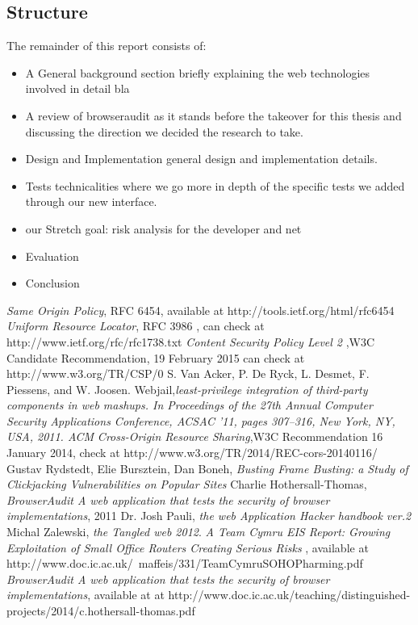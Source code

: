 \documentclass[a4paper,12pt]{report}
\begin{document}
\subsection{Structure}
The remainder of this report consists of:
\begin{itemize}
 \item A General background section briefly explaining the web technologies involved in detail bla
 \item A review of browseraudit as it stands before the takeover for this thesis and discussing the direction we decided the research to take.
 \item Design and Implementation general design and implementation details.
 \item Tests technicalities where we go more in depth of the specific tests we added through our new interface.
 \item our Stretch goal: risk analysis for the developer and net 
 \item Evaluation
 \item Conclusion
\end{itemize}













\begin{thebibliography}{1}
  \emph {Same Origin Policy}, RFC 6454, available at  http://tools.ietf.org/html/rfc6454
  \emph{Uniform Resource Locator}, RFC 3986 , can check at http://www.ietf.org/rfc/rfc1738.txt
  \emph{Content Security Policy Level 2} ,W3C Candidate Recommendation, 19 February 2015 can check at http://www.w3.org/TR/CSP/0
  S. Van Acker, P. De Ryck, L. Desmet, F. Piessens, and W. Joosen. Webjail,\emph {least-privilege integration of third-party components in web mashups. In Proceedings of the 27th Annual Computer Security
Applications Conference, ACSAC ’11, pages 307–316, New York, NY, USA, 2011. ACM}
 \emph{Cross-Origin Resource Sharing},W3C Recommendation 16 January 2014, check at http://www.w3.org/TR/2014/REC-cors-20140116/
  Gustav Rydstedt, Elie Bursztein, Dan Boneh, \emph{Busting Frame Busting: a Study of Clickjacking Vulnerabilities on Popular Sites} 
  Charlie Hothersall-Thomas, \emph{BrowserAudit A web application that tests the security of browser implementations}, 2011
  Dr. Josh Pauli, \emph{the web Application Hacker handbook ver.2}
  Michal Zalewski, \emph{the Tangled web 2012}.
  \emph{ A Team Cymru EIS Report: Growing Exploitation of Small Office Routers Creating Serious Risks} , available at http://www.doc.ic.ac.uk/~maffeis/331/TeamCymruSOHOPharming.pdf
  \emph {BrowserAudit A web application that tests the security of browser implementations}, available at at http://www.doc.ic.ac.uk/teaching/distinguished-projects/2014/c.hothersall-thomas.pdf
\end{thebibliography}
\end{document}
